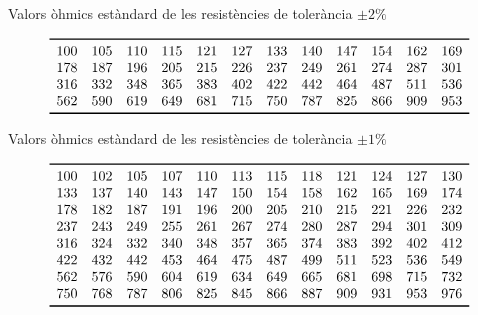 \begin{table}[htb]
   \caption{Valors \`{o}hmics est\`{a}ndard de les resist\`{e}ncies de toler\`{a}ncia $\pm2\unit{\%}$}
   \[ \begin{array}{cccccccccccc}
   \toprule[1pt]
   100 & 105 & 110 & 115 & 121 & 127 & 133 & 140 & 147 & 154 & 162 & 169 \\
   178 & 187 & 196 & 205 & 215 & 226 & 237 & 249 & 261 & 274 & 287 & 301 \\
   316 & 332 & 348 & 365 & 383 & 402 & 422 & 442 & 464 & 487 & 511 & 536 \\
   562 & 590 & 619 & 649 & 681 & 715 & 750 & 787 & 825 & 866 & 909 & 953 \\
   \bottomrule[1pt]
   \end{array}   \]
\end{table}

\begin{table}[htb]
   \caption{Valors \`{o}hmics est\`{a}ndard de les resist\`{e}ncies de toler\`{a}ncia $\pm1\unit{\%}$}
   \[ \begin{array}{cccccccccccc}
   \toprule[1pt]
   100 & 102 & 105 & 107 & 110 & 113 & 115 & 118 & 121 & 124 & 127 & 130 \\
   133 & 137 & 140 & 143 & 147 & 150 & 154 & 158 & 162 & 165 & 169 & 174 \\
   178 & 182 & 187 & 191 & 196 & 200 & 205 & 210 & 215 & 221 & 226 & 232 \\
   237 & 243 & 249 & 255 & 261 & 267 & 274 & 280 & 287 & 294 & 301 & 309 \\
   316 & 324 & 332 & 340 & 348 & 357 & 365 & 374 & 383 & 392 & 402 & 412 \\
   422 & 432 & 442 & 453 & 464 & 475 & 487 & 499 & 511 & 523 & 536 & 549 \\
   562 & 576 & 590 & 604 & 619 & 634 & 649 & 665 & 681 & 698 & 715 & 732 \\
   750 & 768 & 787 & 806 & 825 & 845 & 866 & 887 & 909 & 931 & 953 & 976 \\
   \bottomrule[1pt]
   \end{array}   \]
\end{table}


